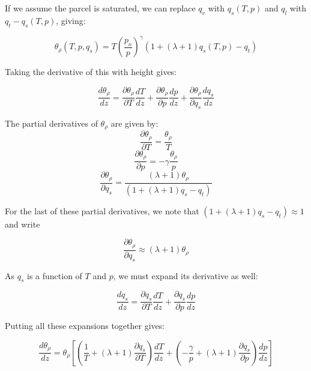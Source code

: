 \documentclass[acp]{copernicus}
\begin{document}
If we assume the parcel is saturated, we can replace $q_v$ with $q_s(T, p)$ and 
$q_l$ with $q_t - q_s(T, p)$, giving:

\begin{equation}
\label{eq:density_potential_temperature_qs}
  \theta_\rho(T, p, q_s) = T \left(\frac{p_o}{p}\right)^\gamma (1 + (\lambda + 1) q_s(T, p) - q_t)
\end{equation}


Taking the derivative of this with height gives:

\begin{equation}
\label{eq:density_potential_temperature_gradient_1}
  \frac{d \theta_\rho}{dz} = \frac{\partial \theta_\rho}{\partial T}\frac{dT}{dz}
                          + \frac{\partial \theta_\rho}{\partial p}\frac{dp}{dz}
                          + \frac{\partial \theta_\rho}{\partial q_s}\frac{dq_s}{dz}
\end{equation}

The partial derivatives of $\theta_\rho$ are given by:
\begin{equation}
  \frac{\partial \theta_\rho}{\partial T} = \frac{\theta_\rho}{T}
\end{equation}
\begin{equation}
  \frac{\partial \theta_\rho}{\partial p} = -\gamma \frac{\theta_\rho}{p}
\end{equation}
\begin{equation}
  \frac{\partial \theta_\rho}{\partial q_s} = \frac{(\lambda + 1)\theta_\rho}{(1 + (\lambda + 1)q_s - q_t)}
\end{equation}

For the last of these partial derivatives, we note that 
$(1 + (\lambda + 1)q_s - q_t) \approx 1$ and write

\begin{equation}
  \frac{\partial \theta_\rho}{\partial q_s} \approx (\lambda + 1) \theta_\rho 
\end{equation}

As $q_s$ is a function of $T$ and $p$, we must expand its derivative as 
well:

\begin{equation}
\label{eq:q_s_derivative}
  \frac{d q_s}{dz} = \frac{\partial q_s}{\partial T}\frac{dT}{dz}
                          + \frac{\partial q_s}{\partial p}\frac{dp}{dz}
\end{equation}

Putting all these expansions together gives:

\begin{equation}
\label{eq:density_potential_temperature_gradient_2}
  \frac{d \theta_\rho}{dz} = \theta_\rho \left[ 
                               \left( \frac{1}{T} + (\lambda + 1)\frac{\partial q_s}{\partial T} \right)\frac{dT}{dz}
                             + \left( -\frac{\gamma}{p} + (\lambda + 1)\frac{\partial q_s}{\partial p} \right)\frac{dp}{dz}
                             \right]
\end{equation}
\end{document}
